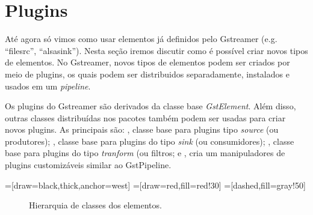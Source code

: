 \section{Plugins}
\label{sec:plugins}
Até agora só vimos como usar elementos já definidos pelo Gstreamer (e.g.
``filesrc'', ``alsasink'').  Nesta seção iremos discutir como é possível criar
novos tipos de elementos.  No Gstreamer, novos tipos de elementos podem ser
criados por meio de plugins, os quais podem ser distribuidos separadamente,
instalados e usados em um \emph{pipeline}. 



Os plugins do Gstreamer são derivados da classe base \emph{GstElement}.  Além
disso, outras classes distribuídas nos pacotes  também podem
ser usadas para criar novos plugins.  As principais são: , classe
base para plugins tipo \emph{source} (ou produtores); , classe
base para plugins do tipo \emph{sink} (ou consumidores); ,
classe base para plugins do tipo \emph{tranform} (ou filtros; e ,
cria um manipuladores de plugins customizáveis similar ao GstPipeline.

=[draw=black,thick,anchor=west]
=[draw=red,fill=red!30]
=[dashed,fill=gray!50]
\begin{figure}[H]
  \centering
  \label{fig:class_hierarchy}
  \caption{Hierarquia de classes dos elementos.}
\end{figure}

